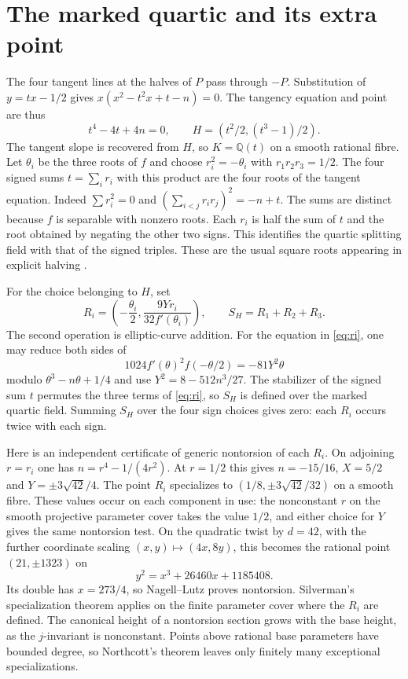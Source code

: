 \documentclass[11pt]{article}
\newcommand{\Q}{\mathbb Q}
\begin{document}
\section{The marked quartic and its extra point}

The four tangent lines at the halves of $P$ pass through $-P$. Substitution
of $y=tx-1/2$ gives $x(x^2-t^2x+t-n)=0$. The tangency equation and
point are thus
\[
 t^4-4t+4n=0,\qquad H=(t^2/2,(t^3-1)/2).
\]
The tangent slope is recovered from $H$, so $K=\Q(t)$ on a smooth
rational fibre. Let $\theta_i$ be the three roots of $f$ and choose
$r_i^2=-\theta_i$ with $r_1r_2r_3=1/2$. The four signed sums
$t=\sum_i r_i$ with this product are the four roots of the tangent
equation. Indeed $\sum r_i^2=0$ and
$(\sum_{i<j} r_i r_j)^2=-n+t$. The sums are distinct because $f$ is
separable with nonzero roots. Each $r_i$ is half the sum of $t$ and
the root obtained by negating the other two signs. This identifies the
quartic splitting field with that of the signed triples. These are the
usual square roots appearing in explicit halving \cite{BZ}.

For the choice belonging to $H$, set
\begin{equation}\label{eq:ri}
 R_i=\left(-\frac{\theta_i}{2},\frac{9Y r_i}{32f'(\theta_i)}\right),
 \qquad S_H=R_1+R_2+R_3.
\end{equation}
The second operation is elliptic-curve addition. For the equation in
\eqref{eq:ri}, one may reduce both sides of
\[
 1024 f'(\theta)^2 f(-\theta/2)=-81Y^2\theta
\]
modulo $\theta^3-n\theta+1/4$ and use $Y^2=8-512n^3/27$.
The stabilizer of the signed sum $t$ permutes the three terms of
\eqref{eq:ri}, so $S_H$ is defined over the marked quartic field.
Summing $S_H$ over the four sign choices gives zero: each $R_i$ occurs
twice with each sign.

Here is an independent certificate of generic nontorsion of each $R_i$.
On adjoining $r=r_i$ one has $n=r^4-1/(4r^2)$. At $r=1/2$ this
gives $n=-15/16$, $X=5/2$ and $Y=\pm3\sqrt{42}/4$. The point $R_i$
specializes to $(1/8,\pm3\sqrt{42}/32)$ on a smooth fibre. These
values occur on each component in use: the nonconstant $r$ on the
smooth projective parameter cover takes the value $1/2$, and either
choice for $Y$ gives the same nontorsion test. On the quadratic twist
by $d=42$, with the further coordinate scaling $(x,y)\mapsto(4x,8y)$,
this becomes the rational point $(21,\pm1323)$ on
\[
 y^2=x^3+26460x+1185408 .
\]
Its double has $x=273/4$, so Nagell--Lutz proves nontorsion.
Silverman's specialization theorem \cite{Silverman} applies on
the finite parameter cover where the $R_i$ are defined. The
canonical height of a nontorsion section grows with the base height,
as the $j$-invariant is nonconstant. Points above rational base
parameters have bounded degree, so Northcott's theorem leaves only
finitely many exceptional specializations.
\end{document}

